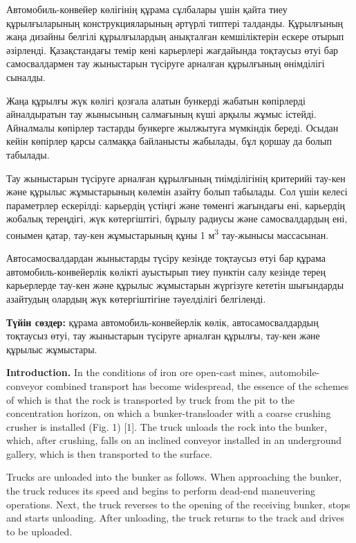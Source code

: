 Автомобиль-конвейер көлігінің құрама сұлбалары үшін қайта тиеу
құрылғыларының конструкцияларының әртүрлі типтері талданды. Құрылғының
жаңа дизайны белгілі құрылғылардың анықталған кемшіліктерін ескере
отырып әзірленді. Қазақстандағы темір кені карьерлері жағдайында
тоқтаусыз өтуі бар самосвалдармен тау жыныстарын түсіруге арналған
құрылғының өнімділігі сыналды.

Жаңа құрылғы жүк көлігі қозғала алатын бункерді жабатын көпірлерді
айналдыратын тау жынысының салмағының күші арқылы жұмыс істейді.
Айналмалы көпірлер тастарды бункерге жылжытуға мүмкіндік береді. Осыдан
кейін көпірлер қарсы салмаққа байланысты жабылады, бұл қоршау да болып
табылады.

Тау жыныстарын түсіруге арналған құрылғының тиімділігінің критерийі
тау-кен және құрылыс жұмыстарының көлемін азайту болып табылады. Сол
үшін келесі параметрлер ескерілді: карьердің үстіңгі және төменгі
жағындағы ені, карьердің жобалық тереңдігі, жүк көтергіштігі, бұрылу
радиусы және самосвалдардың ені, сонымен қатар, тау-кен жұмыстарының
құны 1 м\textsuperscript{3} тау-жынысы массасынан.

Автосамосвалдардан жыныстарды түсіру кезінде тоқтаусыз өтуі бар құрама
автомобиль-конвейерлік көлікті ауыстырып тиеу пунктін салу кезінде терең
карьерлерде тау-кен және құрылыс жұмыстарын жүргізуге кететін шығындарды
азайтудың олардың жүк көтергіштігіне тәуелділігі белгіленді.

{\bfseries Түйін сөздер:} құрама автомобиль-конвейерлік көлік,
автосамосвалдардың тоқтаусыз өтуі, тау жыныстарын түсіруге арналған
құрылғы, тау-кен және құрылыс жұмыстары.

\begin{multicols}{2}
{\bfseries Introduction.} In the conditions of iron ore open-cast mines,
automobile-conveyor combined transport has become widespread, the
essence of the schemes of which is that the rock is transported by truck
from the pit to the concentration horizon, on which a bunker-transloader
with a coarse crushing crusher is installed (Fig. 1) {[}1{]}. The truck
unloads the rock into the bunker, which, after crushing, falls on an
inclined conveyor installed in an underground gallery, which is then
transported to the surface.

Trucks are unloaded into the bunker as follows. When approaching the
bunker, the truck reduces its speed and begins to perform dead-end
maneuvering operations. Next, the truck reverses to the opening of the
receiving bunker, stops and starts unloading. After unloading, the truck
returns to the track and drives to be uploaded.
\end{multicols}

